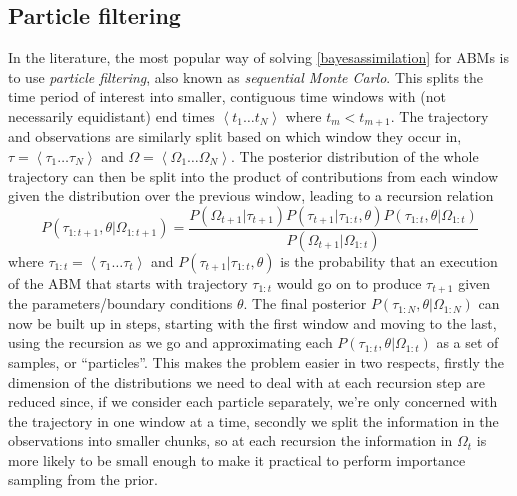 \documentclass{article}
\begin{document}
\subsection{Particle filtering}
In the literature, the most popular way of solving \eqref{bayesassimilation} for ABMs is to use \textit{particle filtering}, also known as \textit{sequential Monte Carlo}. This splits the time period of interest into smaller, contiguous time windows with (not necessarily equidistant) end times $\left<t_1 \dots t_N\right>$ where $t_m < t_{m+1}$. The trajectory and observations are similarly split based on which window they occur in, $\tau = \left<\tau_1 \dots \tau_N\right>$ and $\Omega = \left<\Omega_1 \dots \Omega_N\right>$. The posterior distribution of the whole trajectory can then be split into the product of contributions from each window given the distribution over the previous window, leading to a recursion relation
\begin{equation}
P\left(\tau_{1:t+1}, \theta | \Omega_{1:t+1}\right)
=
\frac{ P(\Omega_{t+1}|\tau_{t+1})
P(\tau_{t+1}|\tau_{1:t},\theta) P\left(\tau_{1:t},\theta| \Omega_{1:t}\right)
}
{	P(\Omega_{t+1}| \Omega_{1:t}) }
\label{bayesrecursion}
\end{equation}
where $\tau_{1:t} = \left<\tau_1 \dots \tau_t\right>$ and $P(\tau_{t+1}|\tau_{1:t},\theta)$ is the probability that an execution of the ABM that starts with trajectory $\tau_{1:t}$ would go on to produce $\tau_{t+1}$ given the parameters/boundary conditions $\theta$. The final posterior $P(\tau_{1:N},\theta|\Omega_{1:N})$ can now be built up in steps, starting with the first window and moving to the last, using the recursion as we go and approximating each $P(\tau_{1:t}, \theta | \Omega_{1:t})$ as a set of samples, or ``particles''. This makes the problem easier in two respects, firstly the dimension of the distributions we need to deal with at each recursion step are reduced since, if we consider each particle separately, we're only concerned with the trajectory in one window at a time, secondly we split the information in the observations into smaller chunks, so at each recursion the information in $\Omega_t$ is more likely to be small enough to make it practical to perform importance sampling from the prior.
\end{document}
